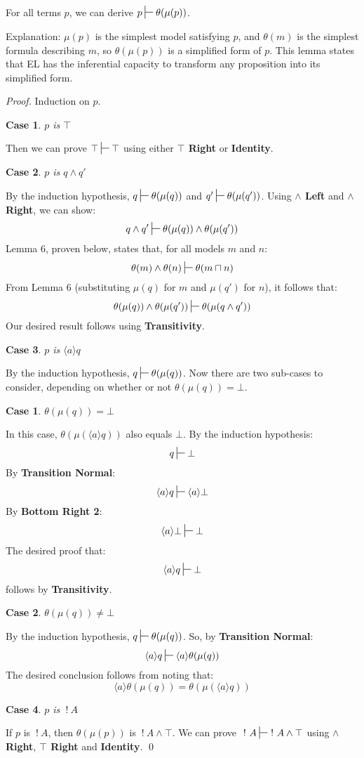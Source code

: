 \documentclass[smallextended]{svjour3}       %
\newtheorem{mycase}{Case}
\newtheorem{subcase}{Case}
\numberwithin{subcase}{mycase}
\def\fBang {\ ! \ }
\def\judge {\sststile{\mathrm{}}{}}
\begin{document}
\begin{lemma}
For all terms $p$, we can derive $p \judge \theta(\mu(p))$.
\end{lemma}
Explanation: $\mu(p)$ is the simplest model satisfying $p$, and $\theta(m)$ is the simplest formula describing $m$, so $\theta(\mu(p))$ is a simplified form of $p$. This lemma states that EL has the inferential capacity to transform any proposition into its simplified form.
\begin{proof}
Induction on $p$.

\setcounter{mycase}{0}

\begin{mycase}
$p$ is $\top$
\end{mycase}
Then we can prove  $\top \judge \top$ using either {\bf $\top$ Right} or {\bf Identity}.

\begin{mycase}
$p$ is $q \land q'$
\end{mycase}
By the induction hypothesis, $q \judge \theta(\mu(q))$ and $q' \judge \theta(\mu(q'))$.
Using {\bf $\land$ Left} and {\bf $\land$ Right}, we can show:
\[
q \land q' \judge \theta(\mu(q)) \land \theta(\mu(q'))
\]
Lemma 6, proven below, states that, for all models $m$ and $n$:
\[
\theta(m) \land \theta(n) \judge \theta (m \sqcap n)
\]
From Lemma 6 (substituting $\mu(q)$ for $m$ and $\mu(q')$ for $n$), it follows that:
\[
\theta(\mu(q)) \land \theta(\mu(q')) \judge \theta(\mu(q \land q'))
\]
Our desired result follows using {\bf Transitivity}.

\begin{mycase}
$p$ is $\langle a \rangle q$
\end{mycase}
By the induction hypothesis, $q \judge \theta(\mu(q))$.
Now there are two sub-cases to consider, depending on whether or not $\theta(\mu(q)) = \bot$.
\begin{subcase}
$\theta(\mu(q)) = \bot$
\end{subcase}
In this case, $\theta(\mu(\langle a \rangle q))$ also equals $\bot$. 
By the induction hypothesis:
\[
q \judge \bot
\]
By {\bf Transition Normal}:
\[
\langle a \rangle q \judge \langle a \rangle \bot
\]
By {\bf Bottom Right 2}:
\[
\langle a \rangle \bot \judge \bot
\]
The desired proof that:
\[
\langle a \rangle q \judge \bot
\]
follows by {\bf Transitivity}.
\begin{subcase}
$\theta(\mu(q)) \neq \bot$
\end{subcase}
By the induction hypothesis, $q \judge \theta(\mu(q))$.
So, by {\bf Transition Normal}:
\[
\langle a \rangle q \judge \langle a \rangle \theta(\mu(q))
\]
The desired conclusion follows from noting that:
\[
 \langle a \rangle \theta(\mu(q)) = \theta(\mu(\langle a \rangle q))
 \]
 \begin{mycase}
$p$ is $\fBang A$
\end{mycase}
If $p$ is $\fBang A$, then $ \theta(\mu(p))$ is $\fBang A \land \top$.
We can prove $\fBang A \judge \fBang A \land \top$ using {\bf $\land$ Right}, {\bf $\top$ Right} and {\bf Identity}.
\qed
\end{proof}
\end{document}

